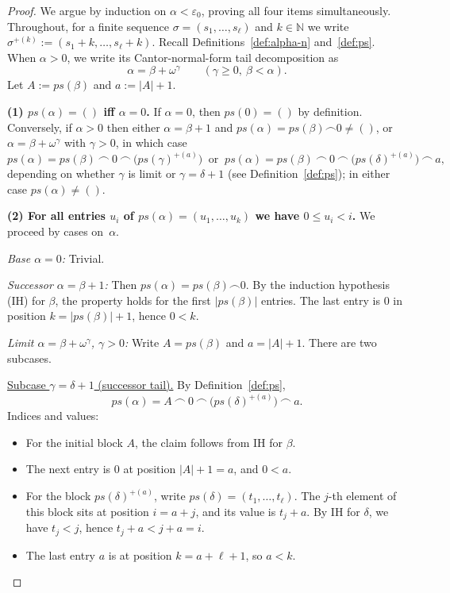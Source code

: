 \documentclass{article}
\theoremstyle{definition}
\theoremstyle{remark}
\begin{document}
\begin{proof}
We argue by induction on $\alpha<\varepsilon_0$, proving all four items simultaneously. 
Throughout, for a finite sequence $\sigma=(s_1,\dots,s_\ell)$ and $k\in\mathbb{N}$ we write $\sigma^{+(k)}:=(s_1+k,\dots,s_\ell+k)$. 
Recall Definitions~\ref{def:alpha-n} and~\ref{def:ps}. 
When $\alpha>0$, we write its Cantor-normal-form tail decomposition as
\[
\alpha=\beta+\omega^\gamma\qquad(\gamma\ge 0,\ \beta<\alpha).
\]
Let $A:=ps(\beta)$ and $a:=|A|+1$.

\smallskip
\noindent\textbf{(1) $ps(\alpha)=()$ iff $\alpha=0$.}
If $\alpha=0$, then $ps(0)=()$ by definition. 
Conversely, if $\alpha>0$ then either $\alpha=\beta+1$ and $ps(\alpha)=ps(\beta)\frown 0\neq()$, or $\alpha=\beta+\omega^\gamma$ with $\gamma>0$, in which case
\[
ps(\alpha)=ps(\beta)\ \frown\ 0\ \frown\ \bigl(ps(\gamma)^{+(a)}\bigr)\ \text{ or }\ 
ps(\alpha)=ps(\beta)\ \frown\ 0\ \frown\ \bigl(ps(\delta)^{+(a)}\bigr)\ \frown\ a,
\]
depending on whether $\gamma$ is limit or $\gamma=\delta+1$ (see Definition~\ref{def:ps}); in either case $ps(\alpha)\neq()$. 

\smallskip
\noindent\textbf{(2) For all entries $u_i$ of $ps(\alpha)=(u_1,\ldots,u_k)$ we have $0\le u_i<i$.}
We proceed by cases on~$\alpha$.

\emph{Base \(\alpha=0\):} Trivial.

\emph{Successor \(\alpha=\beta+1\):} Then $ps(\alpha)=ps(\beta)\frown 0$. 
By the induction hypothesis (IH) for $\beta$, the property holds for the first $|ps(\beta)|$ entries. 
The last entry is $0$ in position $k=|ps(\beta)|+1$, hence $0<k$.

\emph{Limit \(\alpha=\beta+\omega^\gamma\), \(\gamma>0\):} 
Write $A=ps(\beta)$ and $a=|A|+1$. There are two subcases.

\underline{Subcase \(\gamma=\delta+1\) (successor tail).}
By Definition~\ref{def:ps},
\[
ps(\alpha)=A\ \frown\ 0\ \frown\ \bigl(ps(\delta)^{+(a)}\bigr)\ \frown\ a.
\]
Indices and values:
\begin{itemize}
  \item For the initial block $A$, the claim follows from IH for $\beta$.
  \item The next entry is $0$ at position $|A|+1=a$, and $0<a$.
  \item For the block $ps(\delta)^{+(a)}$, write $ps(\delta)=(t_1,\dots,t_\ell)$. 
  The $j$-th element of this block sits at position $i=a+j$, and its value is $t_j+a$. 
  By IH for $\delta$, we have $t_j<j$, hence $t_j+a<j+a=i$.
  \item The last entry $a$ is at position $k=a+\ell+1$, so $a<k$.
\end{itemize}


\end{proof}
\end{document}
